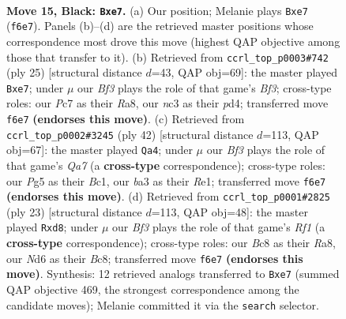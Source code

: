 \documentclass[11pt]{article}
\begin{document}
\clearpage

\begin{figure}[p]\centering
\begin{subfigure}{0.46\textwidth}\centering
\resizebox{\linewidth}{!}{%
\newchessgame
\chessboard[
  setfen={r1b3k1/ppppQp1p/3n1b2/6p1/8/BPN2P2/P1PP2PP/R4BK1 b - - 0 15},
  showmover=false,
  pgfstyle=straightmove, color=movearrow, markmove={f6-e7}
]}
\caption{}
\end{subfigure}\hfill
\begin{subfigure}{0.46\textwidth}\centering
\resizebox{\linewidth}{!}{%
\newchessgame
\chessboard[
  setfen={r1b3k1/ppppQppp/3n1b2/8/3P4/2P5/PP3PPP/RNB2BK1 b - - 0 13},
  showmover=false,
  pgfstyle=straightmove, color=movearrow, markmove={f6-e7}
]}
\caption{}
\end{subfigure}
\\[4pt]
\begin{subfigure}{0.46\textwidth}\centering
\resizebox{\linewidth}{!}{%
\newchessgame
\chessboard[
  setfen={2b1r1k1/Qp1n1pbp/1q2p1p1/1P6/3P4/5N2/5PPP/2B1RBK1 w - - 5 22},
  showmover=false,
  pgfstyle=straightmove, color=movearrow, markmove={a7-a4}
]}
\caption{}
\end{subfigure}\hfill
\begin{subfigure}{0.46\textwidth}\centering
\resizebox{\linewidth}{!}{%
\newchessgame
\chessboard[
  setfen={r1bQ1rk1/pp2bppp/5n2/4p3/4P3/P1N1B2P/1PP3P1/R3KB1R b KQ - 0 12},
  showmover=false,
  pgfstyle=straightmove, color=movearrow, markmove={f8-d8}
]}
\caption{}
\end{subfigure}
\caption{\textbf{Move 15, Black: \texttt{Bxe7}.} (a) Our position; Melanie plays \texttt{Bxe7} (\texttt{f6e7}). Panels (b)--(d) are the retrieved master positions whose correspondence most drove this move (highest QAP objective among those that transfer to it). (b) Retrieved from \texttt{ccrl\_top\_p0003\#742} (ply 25) [structural distance $d$=43, QAP obj=69]: the master played \texttt{Bxe7}; under $\mu$ our \emph{Bf3} plays the role of that game's \emph{Bf3}; cross-type roles: our \emph{P}c7 as their \emph{R}a8, our \emph{n}c3 as their \emph{p}d4; transferred move \texttt{f6e7} \textbf{(endorses this move)}. (c) Retrieved from \texttt{ccrl\_top\_p0002\#3245} (ply 42) [structural distance $d$=113, QAP obj=67]: the master played \texttt{Qa4}; under $\mu$ our \emph{Bf3} plays the role of that game's \emph{Qa7} (a \textbf{cross-type} correspondence); cross-type roles: our \emph{P}g5 as their \emph{B}c1, our \emph{b}a3 as their \emph{R}e1; transferred move \texttt{f6e7} \textbf{(endorses this move)}. (d) Retrieved from \texttt{ccrl\_top\_p0001\#2825} (ply 23) [structural distance $d$=113, QAP obj=48]: the master played \texttt{Rxd8}; under $\mu$ our \emph{Bf3} plays the role of that game's \emph{Rf1} (a \textbf{cross-type} correspondence); cross-type roles: our \emph{B}c8 as their \emph{R}a8, our \emph{N}d6 as their \emph{B}c8; transferred move \texttt{f6e7} \textbf{(endorses this move)}. Synthesis: 12 retrieved analogs transferred to \texttt{Bxe7} (summed QAP objective 469, the strongest correspondence among the candidate moves); Melanie committed it via the \texttt{search} selector.}
\label{fig:thought-m29}
\end{figure}
\end{document}
